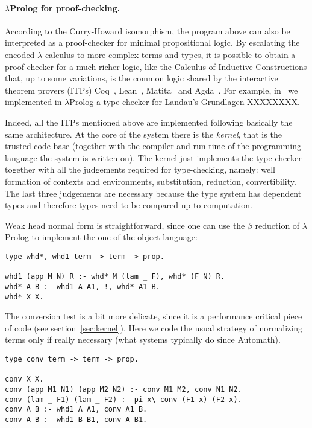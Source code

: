 \documentclass{easychair}
\begin{document}
\paragraph{$\lambda$Prolog for proof-checking.}

According to the Curry-Howard isomorphism, the program above can also
be interpreted as a proof-checker for minimal propositional logic. By
escalating the encoded $\lambda$-calculus to more complex terms and
types, it is possible to obtain a proof-checker for a much richer
logic, like the Calculus of Inductive Constructions that, up to some
variations, is the common logic shared by the interactive theorem
provers (ITPs) Coq~\cite{}, Lean~\cite{}, Matita~\cite{} and
Agda~\cite{}. For example, in~\cite{us} we implemented in
$\lambda$Prolog a type-checker for Landau's Grundlagen XXXXXXXX.

Indeed, all the ITPs mentioned above are implemented following
basically the same architecture. At the core of the system there is
the \emph{kernel}, that is the trusted code base (together with the
compiler and run-time of the programming language the system is
written on). The kernel just implements the type-checker together with
all the judgements required for type-checking, namely: well formation
of contexts and environments, substitution, reduction, convertibility.
The last three judgements are necessary because the type system has
dependent types and therefore types need to be compared up to
computation.

Weak head normal form is straightforward, since one can use the
$\beta$ reduction of $\lambda$Prolog to implement the one of the
object language:

\begin{verbatim}
type whd*, whd1 term -> term -> prop.

whd1 (app M N) R :- whd* M (lam _ F), whd* (F N) R.
whd* A B :- whd1 A A1, !, whd* A1 B.
whd* X X.
\end{verbatim}

The conversion test is a bit more delicate, since it is a performance
critical piece of code (see section~\ref{sec:kernel}).  Here we code
the usual strategy of normalizing terms only if really necessary (what
systems typically do since Automath).

\begin{verbatim}
type conv term -> term -> prop.

conv X X.
conv (app M1 N1) (app M2 N2) :- conv M1 M2, conv N1 N2.
conv (lam _ F1) (lam _ F2) :- pi x\ conv (F1 x) (F2 x).
conv A B :- whd1 A A1, conv A1 B.
conv A B :- whd1 B B1, conv A B1.
\end{verbatim}
\end{document}
